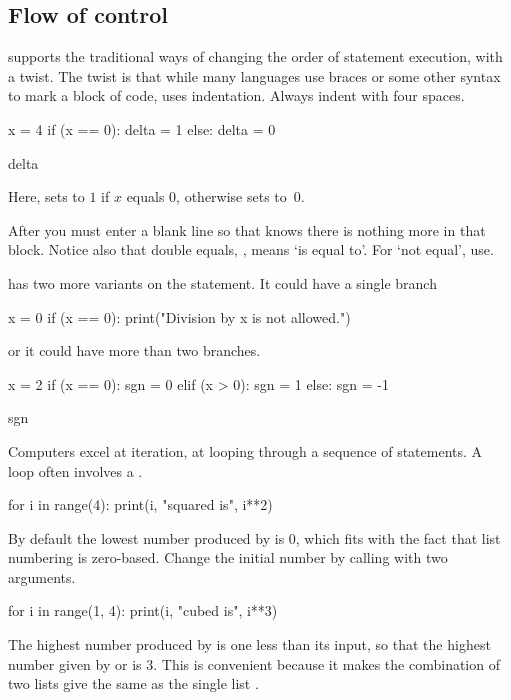 \subsection{Flow of control}
\python{} supports the traditional ways of changing the order of 
statement execution, with a twist.
The twist is that while many languages use braces or some other syntax to
mark a block of code, \python{} uses indentation.
Always indent with four spaces. %
\begin{pythonconsole}
x = 4
if (x == 0):
    delta = 1
else:
    delta = 0

delta
\end{pythonconsole}
Here, \python{} sets  to  $1$ if $x$
equals $0$, otherwise \python{} sets  to~$0$. 

After  you must enter 
a blank line so that \python{} knows there is nothing more in that block.
Notice also that double equals, \inlinecode{==}, means `is equal to'. 
For `not equal', use\inlinecode{!=}. 

\python{} has two more variants on the  statement.
It could have a single branch
\begin{pythonconsole}
x = 0
if (x == 0):
    print("Division by x is not allowed.")

\end{pythonconsole}
or it could have more than two branches.
\begin{pythonconsole}
x = 2
if (x == 0):
    sgn = 0
elif (x > 0):
    sgn = 1
else:
    sgn = -1

sgn
\end{pythonconsole}

Computers excel at iteration, at looping through a sequence of statements.
A  loop often involves a .
\begin{pythonconsole}
for i in range(4):
    print(i, "squared is", i**2)

\end{pythonconsole}
By default the lowest number produced by  is $0$, which
fits with the fact that list numbering is zero-based.
Change the initial number by calling  
with two arguments.
\begin{pythonconsole}
for i in range(1, 4):
    print(i, "cubed is", i**3)

\end{pythonconsole}
The highest number produced by  is one less than its 
input, so that the highest number
given by  or  is $3$.
This is convenient because it makes the 
combination of two lists  give 
the same as the single list .

